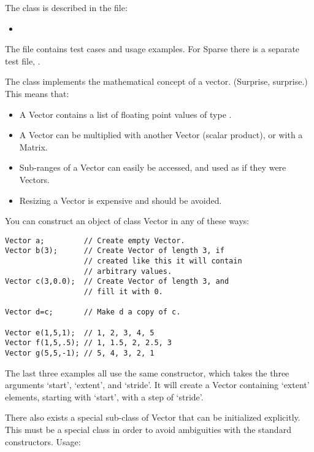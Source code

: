 The  class is described in the file:
\begin{itemize}
\item {}
\end{itemize}

The file  contains test cases and usage
examples. For Sparse there is a separate test file, 
.

\label{sec:matpack:vectors}

The class  implements the mathematical concept of a
vector. (Surprise, surprise.) This means that:
\begin{itemize}
\item A Vector contains a list of floating point values of type .
\item A Vector can be multiplied with another Vector (scalar product),
  or with a Matrix.
\item Sub-ranges of a Vector can easily be accessed, and used as if
  they were Vectors.
\item Resizing a Vector is expensive and should be avoided.
\end{itemize}

You can construct an object of class Vector in any of these ways:

\begin{verbatim}
Vector a;         // Create empty Vector.
Vector b(3);      // Create Vector of length 3, if
                  // created like this it will contain
                  // arbitrary values.
Vector c(3,0.0);  // Create Vector of length 3, and
                  // fill it with 0.

Vector d=c;       // Make d a copy of c.

Vector e(1,5,1);  // 1, 2, 3, 4, 5
Vector f(1,5,.5); // 1, 1.5, 2, 2.5, 3
Vector g(5,5,-1); // 5, 4, 3, 2, 1
\end{verbatim}

The last three examples all use the same constructor, which takes
the three arguments `start', `extent', and `stride'. It will create a
Vector containing `extent' elements, starting with `start', with a
step of `stride'.

There also exists a special sub-class of Vector that can be initialized
explicitly. This must be a special class in order to avoid ambiguities
with the standard constructors. Usage:

